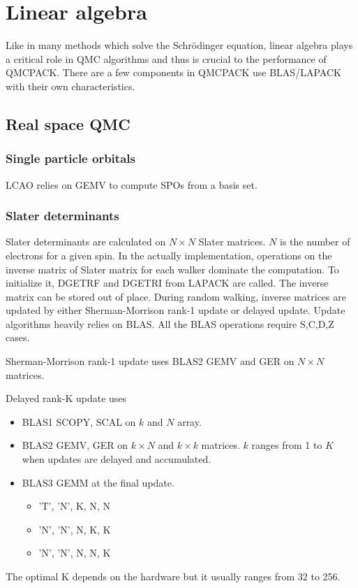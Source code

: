 \section{Linear algebra}

Like in many methods which solve the Schr\"odinger equation, linear algebra plays a critical role in QMC algorithms and thus is crucial to the performance of QMCPACK.
There are a few components in QMCPACK use BLAS/LAPACK with their own characteristics.

\subsection{Real space QMC}
\subsubsection{Single particle orbitals}
LCAO relies on GEMV to compute SPOs from a basis set.

\subsubsection{Slater determinants}
Slater determinants are calculated on $N \times N$ Slater matrices. $N$ is the number of electrons for a given spin.
In the actually implementation, operations on the inverse matrix of Slater matrix for each walker dominate the computation.
To initialize it, DGETRF and DGETRI from LAPACK are called. The inverse matrix can be stored out of place.
During random walking, inverse matrices are updated by either Sherman-Morrison rank-1 update or delayed update.
Update algorithms heavily relies on BLAS. All the BLAS operations require S,C,D,Z cases.

Sherman-Morrison rank-1 update uses BLAS2 GEMV and GER on $N \times N$ matrices.

Delayed rank-K update uses
\begin{itemize}
  \item BLAS1 SCOPY, SCAL on $k$ and $N$ array.
  \item BLAS2 GEMV, GER on $k \times N$ and $k \times k$ matrices. $k$ ranges from 1 to $K$ when updates are delayed and accumulated.
  \item BLAS3 GEMM at the final update.
    \begin{itemize}
       \item 'T', 'N', K, N, N
       \item 'N', 'N', N, K, K
       \item 'N', 'N', N, N, K
    \end{itemize}
\end{itemize}
The optimal K depends on the hardware but it usually ranges from 32 to 256.

